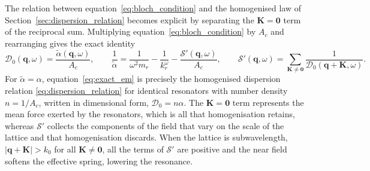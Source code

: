 The relation between equation~\eqref{eq:bloch_condition} and the homogenised law of Section~\ref{sec:dispersion_relation} becomes explicit by separating the $\mathbf{K}=\mathbf{0}$ term of the reciprocal sum. Multiplying equation~\eqref{eq:bloch_condition} by $A_c$ and rearranging gives the exact identity
\begin{equation}
  \label{eq:exact_em}
  \mathcal{D}_0(\mathbf{q},\omega)=\frac{\widetilde{\alpha}(\mathbf{q},\omega)}{A_c},
  \qquad
  \frac{1}{\widetilde{\alpha}}=\frac{1}{\omega^2m_r}-\frac{1}{k_r^\omega}-\frac{\mathcal{S}'(\mathbf{q},\omega)}{A_c},
  \qquad
  \mathcal{S}'(\mathbf{q},\omega)=\sum_{\mathbf{K}\neq\mathbf{0}}\frac{1}{\mathcal{D}_0(\mathbf{q}+\mathbf{K},\omega)} .
\end{equation}
For $\widetilde{\alpha}=\alpha$, equation~\eqref{eq:exact_em} is precisely the homogenised dispersion relation \eqref{eq:dispersion_relation} for identical resonators with number density $n=1/A_c$, written in dimensional form, $\mathcal{D}_0=n\alpha$. The $\mathbf{K}=\mathbf{0}$ term represents the mean force exerted by the resonators, which is all that homogenisation retains, whereas $\mathcal{S}'$ collects the components of the field that vary on the scale of the lattice and that homogenisation discards. When the lattice is subwavelength, $|\mathbf{q}+\mathbf{K}|>k_0$ for all $\mathbf{K}\neq\mathbf{0}$, all the terms of $\mathcal{S}'$ are positive and the near field softens the effective spring, lowering the resonance.

